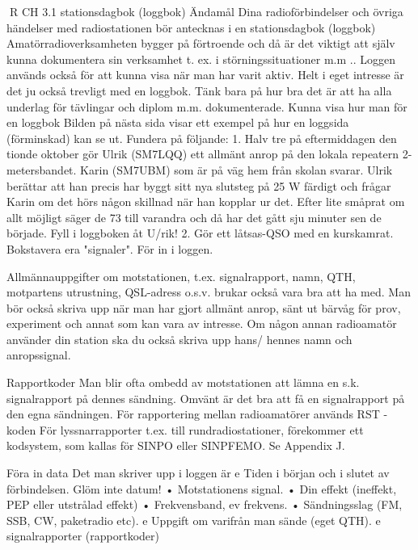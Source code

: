 R CH
3.1 stationsdagbok (loggbok)
Ändamål
Dina radioförbindelser och övriga händelser
med radiostationen bör antecknas i en
stationsdagbok (loggbok)
Amatörradioverksamheten bygger på förtroende och då är det viktigt att själv kunna
dokumentera sin verksamhet t. ex. i störningssituationer m.m .. Loggen används också för
att kunna visa när man har varit aktiv.
Helt i eget intresse är det ju också trevligt
med en loggbok. Tänk bara på hur bra det är
att ha alla underlag för tävlingar och diplom
m.m. dokumenterade.
Kunna visa hur man för en loggbok
Bilden på nästa sida visar ett exempel på
hur en loggsida (förminskad) kan se ut.
Fundera på följande:
1. Halv tre på eftermiddagen den tionde
oktober gör Ulrik (SM7LQQ) ett allmänt anrop på den lokala repeatern 2-metersbandet.
Karin (SM7UBM) som är på väg hem från
skolan svarar. Ulrik berättar att han precis
har byggt sitt nya slutsteg på 25 W färdigt
och frågar Karin om det hörs någon skillnad
när han kopplar ur det. Efter lite småprat om
allt möjligt säger de 73 till varandra och då
har det gått sju minuter sen de började.
Fyll i loggboken åt U/rik!
2. Gör ett låtsas-QSO med en kurskamrat. Bokstavera era "signaler". För in i loggen.

Allmännauppgifter om motstationen, t.ex.
signalrapport, namn, QTH, motpartens utrustning, QSL-adress o.s.v. brukar också
vara bra att ha med.
Man bör också skriva upp när man har
gjort allmänt anrop, sänt ut bärvåg för prov,
experiment och annat som kan vara av intresse.
Om någon annan radioamatör använder
din station ska du också skriva upp hans/
hennes namn och anropssignal.

Rapportkoder
Man blir ofta ombedd av motstationen att
lämna en s.k. signalrapport på dennes sändning. Omvänt är det bra att få en signalrapport på den egna sändningen.
För rapportering mellan radioamatörer
används RST -koden
För lyssnarrapporter t.ex. till rundradiostationer, förekommer ett kodsystem, som
kallas för SINPO eller SINPFEMO.
Se Appendix J.

Föra in data
Det man skriver upp i loggen är
e
Tiden i början och i slutet av förbindelsen.
Glöm inte datum!
• Motstationens signal.
• Din effekt (ineffekt, PEP eller utstrålad
effekt)
• Frekvensband, ev frekvens.
• Sändningsslag (FM, SSB, CW, paketradio etc).
e
Uppgift om varifrån man sände (eget
QTH).
e
signalrapporter (rapportkoder)
